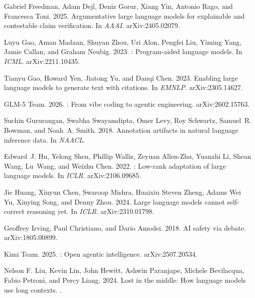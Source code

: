 \documentclass[11pt]{article}%
\begin{document}
\begin{thebibliography}{}
Gabriel Freedman, Adam Dejl, Deniz Gorur, Xiang Yin, Antonio Rago, and
  Francesca Toni. 2025.
\newblock Argumentative large language models for explainable and contestable
  claim verification.
\newblock In {\em AAAI}. arXiv:2405.02079.

Luyu Gao, Aman Madaan, Shuyan Zhou, Uri Alon, Pengfei Liu, Yiming Yang, Jamie
  Callan, and Graham Neubig. 2023.
: Program-aided language models.
\newblock In {\em ICML}. arXiv:2211.10435.

Tianyu Gao, Howard Yen, Jiatong Yu, and Danqi Chen. 2023.
\newblock Enabling large language models to generate text with citations.
\newblock In {\em EMNLP}. arXiv:2305.14627.

GLM-5 Team. 2026.
: From vibe coding to agentic engineering.
\newblock arXiv:2602.15763.

Suchin Gururangan, Swabha Swayamdipta, Omer Levy, Roy Schwartz, Samuel~R. Bowman,
  and Noah~A. Smith. 2018.
\newblock Annotation artifacts in natural language inference data.
\newblock In {\em NAACL}.

Edward~J. Hu, Yelong Shen, Phillip Wallis, Zeyuan Allen-Zhu, Yuanzhi Li, Shean
  Wang, Lu~Wang, and Weizhu Chen. 2022.
: Low-rank adaptation of large language models.
\newblock In {\em ICLR}. arXiv:2106.09685.

Jie Huang, Xinyun Chen, Swaroop Mishra, Huaixiu Steven Zheng, Adams Wei Yu,
  Xinying Song, and Denny Zhou. 2024.
\newblock Large language models cannot self-correct reasoning yet.
\newblock In {\em ICLR}. arXiv:2310.01798.

Geoffrey Irving, Paul Christiano, and Dario Amodei. 2018.
\newblock AI safety via debate.
\newblock arXiv:1805.00899.

Kimi Team. 2025.
: Open agentic intelligence.
\newblock arXiv:2507.20534.

Nelson F. Liu, Kevin Lin, John Hewitt, Ashwin Paranjape, Michele Bevilacqua,
  Fabio Petroni, and Percy Liang. 2024.
\newblock Lost in the middle: How language models use long contexts.
.


\end{thebibliography}
\end{document}
